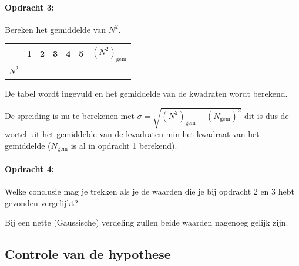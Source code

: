 \begin{minipage}[t]{1\columnwidth}%

\paragraph{Opdracht 3:}

Bereken het gemiddelde van $N^{2}$.

\bigskip{}

\begin{tabular}{|x{.11\textwidth}|x{.11\textwidth}|x{.11\textwidth}
                |x{.11\textwidth}|x{.11\textwidth}|x{.11\textwidth}
                |x{.11\textwidth}|}
     & 1 & 2 & 3 & 4 & 5 & $\left(N^{2}\right)_\textrm{gem}$\\
    \hline 
    $N^{2}$ &  &  &  &  &  & \\
    \hline 
\end{tabular}


\bigskip{}

De tabel wordt ingevuld en het gemiddelde van de kwadraten wordt berekend.

\bigskip{}

De spreiding is nu te berekenen met
$\sigma=\sqrt{\left(N^{2}\right)_\textrm{gem}-\left(N_\textrm{gem}\right)^{2}}$ dit is
dus de wortel uit het gemiddelde van de kwadraten min het kwadraat van
het gemiddelde ($N_\textrm{gem}$ is al in opdracht 1 berekend).

\end{minipage}

\bigskip{}

\begin{minipage}[t]{1\columnwidth}%

\paragraph{Opdracht 4:}

Welke conclusie mag je trekken als je de waarden die je bij opdracht
2 en 3 hebt gevonden vergelijkt?

\smallskip{}

Bij een nette (Gaussische) verdeling zullen beide waarden nagenoeg
gelijk zijn. %
\end{minipage}


\subsection{Controle van de hypothese}


